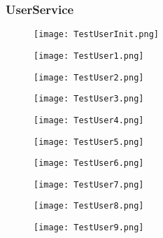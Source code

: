 \subsubsection{UserService}
\begin{figure}[h!]
    \begin{center}
        \texttt{[image: TestUserInit.png]}
    \end{center}
\end{figure}
\begin{figure}[h!]
    \begin{center}
        \texttt{[image: TestUser1.png]}
    \end{center}
\end{figure}
\begin{figure}[h!]
    \begin{center}
        \texttt{[image: TestUser2.png]}
    \end{center}
\end{figure}
\begin{figure}[h!]
    \begin{center}
        \texttt{[image: TestUser3.png]}
    \end{center}
\end{figure}
\begin{figure}[h!]
    \begin{center}
        \texttt{[image: TestUser4.png]}
    \end{center}
\end{figure}
\begin{figure}[h!]
    \begin{center}
        \texttt{[image: TestUser5.png]}
    \end{center}
\end{figure}
\begin{figure}[h!]
    \begin{center}
        \texttt{[image: TestUser6.png]}
    \end{center}
\end{figure}
\begin{figure}[h!]
    \begin{center}
        \texttt{[image: TestUser7.png]}
    \end{center}
\end{figure}
\begin{figure}[h!]
    \begin{center}
        \texttt{[image: TestUser8.png]}
    \end{center}
\end{figure}
\begin{figure}[h!]
    \begin{center}
        \texttt{[image: TestUser9.png]}
    \end{center}
\end{figure}
\clearpage

